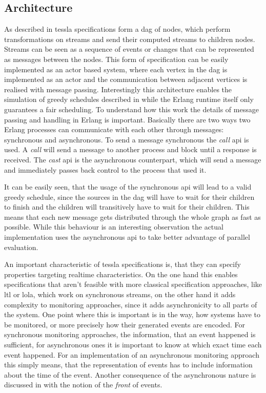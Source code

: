 \subsection{Architecture}
\label{sec:implementation:tesslaserver:architecture}

As described in  \gls{tessla} specifications form a \gls{dag} of nodes, which perform transformations on streams and send their computed streams to children nodes.
Streams can be seen as a sequence of events or changes that can be represented as messages between the nodes.
This form of specification can be easily implemented as an actor based system, where each vertex in the \gls{dag} is implemented as an actor and the communication between adjacent vertices is realised with message passing.
Interestingly this architecture enables the simulation of greedy schedules described in  while the Erlang runtime itself only guarantees a fair scheduling.
To understand how this work the details of message passing and handling in Erlang is important.
Basically there are two ways two Erlang processes can communicate with each other through messages: synchronous and asynchronous.
To send a message synchronous the \emph{call} \gls{api} is used.
A \emph{call} will send a message to another process and block until a response is received.
The \emph{cast} \gls{api} is the asynchronous counterpart, which will send a message and immediately passes back control to the process that used it.

It can be easily seen, that the usage of the synchronous \gls{api} will lead to a valid greedy schedule, since the sources in the \gls{dag} will have to wait for their children to finish and the children will transitively have to wait for their children.
This means that each new message gets distributed through the whole graph as fast as possible.
While this behaviour is an interesting observation the actual implementation uses the asynchronous \gls{api} to take better advantage of parallel evaluation.

An important characteristic of \gls{tessla} specifications is, that they can specify properties targeting realtime characteristics.
On the one hand this enables specifications that aren't feasible with more classical specification approaches, like \gls{ltl} or \gls{lola}, which work on synchronous streams, on the other hand it adds complexity to monitoring approaches, since it adds asynchronicity to all parts of the system.
One point where this is important is in the way, how systems have to be monitored, or more precisely how their generated events are encoded.
For synchronous monitoring approaches, the information, that an event happened is sufficient, for asynchronous ones it is important to know at which exact time each event happened.
For an implementation of an asynchronous monitoring approach this simply means, that the representation of events has to include information about the time of the event.
Another consequence of the asynchronous nature is discussed in  with the notion of the \emph{front} of events.

